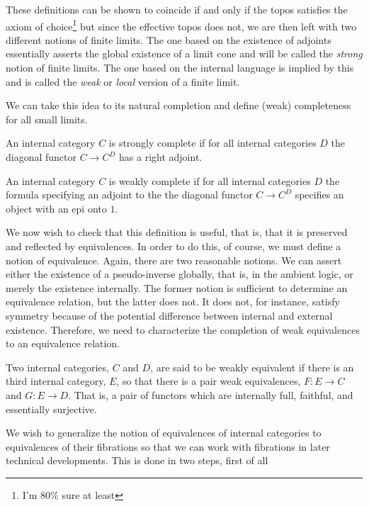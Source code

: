 These definitions can be shown to coincide if and only if the topos
satisfies the axiom of choice\footnote{I'm 80\% sure at least} but
since the effective topos does not, we are then left with two
different notions of finite limits. The one based on the existence of
adjoints essentially asserts the global existence of a limit cone and
will be called the \emph{strong} notion of finite limits. The one
based on the internal language is implied by this and is called the
\emph{weak} or \emph{local} version of a finite limit.

We can take this idea to its natural completion and define (weak)
completeness for all small limits.
\begin{defn}\label{defn:complete:complete}
  An internal category $C$ is strongly complete if for all internal
  categories $D$ the diagonal functor $C \to C^D$ has a right
  adjoint.
\end{defn}
\begin{defn}\label{defn:complete:weakcompletebroken}
  An internal category $C$ is weakly complete if for all internal
  categories $D$ the formula specifying an adjoint to the the diagonal
  functor $C \to C^D$ specifies an object with an epi onto $1$.
\end{defn}
We now wish to check that this definition is useful, that is, that it
is preserved and reflected by equivalences. In order to do this, of
course, we must define a notion of equivalence. Again, there are two
reasonable notions. We can assert either the existence of a
pseudo-inverse globally, that is, in the ambient logic, or merely the
existence internally. The former notion is sufficient to determine an
equivalence relation, but the latter does not. It does not, for
instance, satisfy symmetry because of the potential difference between
internal and external existence. Therefore, we need to characterize
the completion of weak equivalences to an equivalence relation.
\begin{defn}\label{defn:complete:weakequivalence}
  Two internal categories, $C$ and $D$, are said to be weakly
  equivalent if there is an third internal category, $E$, so that
  there is a pair weak equivalences, $F : E \to C$ and $G : E \to
  D$. That is, a pair of functors which are internally full, faithful,
  and essentially surjective.
\end{defn}
We wish to generalize the notion of equivalences of internal
categories to equivalences of their fibrations so that we can work
with fibrations in later technical developments. This is done in two
steps, first of all
